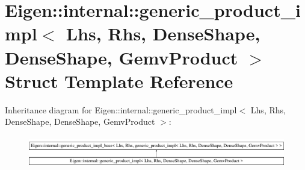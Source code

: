 \hypertarget{struct_eigen_1_1internal_1_1generic__product__impl_3_01_lhs_00_01_rhs_00_01_dense_shape_00_01_de08ea17a2bb9af046a7c3ddff957c62b0}{}\section{Eigen\+::internal\+::generic\+\_\+product\+\_\+impl$<$ Lhs, Rhs, Dense\+Shape, Dense\+Shape, Gemv\+Product $>$ Struct Template Reference}
\label{struct_eigen_1_1internal_1_1generic__product__impl_3_01_lhs_00_01_rhs_00_01_dense_shape_00_01_de08ea17a2bb9af046a7c3ddff957c62b0}
Inheritance diagram for Eigen\+::internal\+::generic\+\_\+product\+\_\+impl$<$ Lhs, Rhs, Dense\+Shape, Dense\+Shape, Gemv\+Product $>$\+:\begin{figure}[H]
\begin{center}
\leavevmode
\includegraphics[height=1.421320cm]{struct_eigen_1_1internal_1_1generic__product__impl_3_01_lhs_00_01_rhs_00_01_dense_shape_00_01_de08ea17a2bb9af046a7c3ddff957c62b0}
\end{center}
\end{figure}
